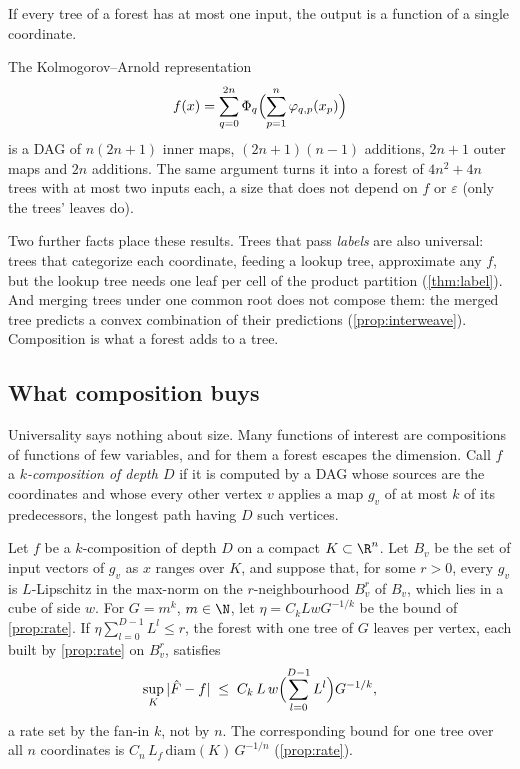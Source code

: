 \begin{proposition}\label{prop:fanin-main}
If every tree of a forest has at most one input, the output is a function of a single
coordinate.
\end{proposition}

\begin{remark}\label{rem:ka-main}
The Kolmogorov--Arnold representation
\begin{equation}\label{eq:ka}
  f(x)=\sum_{q=0}^{2n}\Phi_q\Bigl(\sum_{p=1}^n\varphi_{q,p}(x_p)\Bigr)
\end{equation}
is a DAG of
$n(2n+1)$ inner maps, $(2n+1)(n-1)$ additions, $2n+1$ outer maps and $2n$ additions.  The
same argument turns it into a forest of $4n^2+4n$ trees with at most two inputs each, a
size that does not depend on $f$ or $\varepsilon$ (only the trees' leaves do).
\end{remark}

Two further facts place these results.  Trees that pass \emph{labels} are also universal:
trees that categorize each coordinate, feeding a lookup tree, approximate any $f$, but the
lookup tree needs one leaf per cell of the product partition (\cref{thm:label}).  And
merging trees under one common root does not compose them: the merged tree predicts a
convex combination of their predictions (\cref{prop:interweave}).  Composition is what a
forest adds to a tree.

\subsection{What composition buys}

Universality says nothing about size.  Many functions of interest are compositions of
functions of few variables, and for them a forest escapes the dimension.  Call $f$ a
\emph{$k$-composition of depth $D$} if it is computed by a DAG whose sources are the
coordinates and whose every other vertex $v$ applies a map $g_v$ of at most $k$ of its
predecessors, the longest path having $D$ such vertices.

\begin{theorem}\label{thm:compose}
Let $f$ be a $k$-composition of depth $D$ on a compact $K\subset\R^n$.  Let $B_v$ be the
set of input vectors of $g_v$ as $x$ ranges over $K$, and suppose that, for some $r>0$,
every $g_v$ is $L$-Lipschitz in the max-norm on the $r$-neighbourhood $B_v^r$ of $B_v$,
which lies in a cube of side $w$.  For $G=m^k$, $m\in\N$, let $\eta=C_kLwG^{-1/k}$ be the
bound of \cref{prop:rate}.  If $\eta\sum_{l=0}^{D-1}L^l\le r$, the forest with one tree of $G$
leaves per vertex, each built by \cref{prop:rate} on $B_v^r$, satisfies
\[
  \sup_K|\hat F-f|\;\le\;C_k\,L\,w\Bigl(\sum_{l=0}^{D-1}L^l\Bigr)G^{-1/k},
\]
a rate set by the fan-in $k$, not by $n$.  The corresponding bound for one tree over all
$n$ coordinates is $C_n\,L_f\,\mathrm{diam}(K)\,G^{-1/n}$ (\cref{prop:rate}).
\end{theorem}


